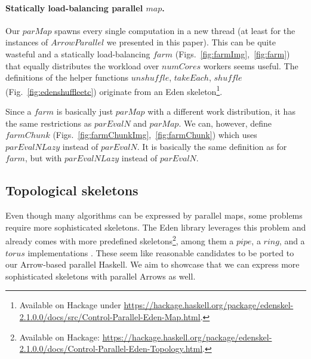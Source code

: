 \documentclass{jfp1}
\newcommand{\Conid}[1]{\mathit{#1}}
\newcommand{\Varid}[1]{\mathit{#1}}
\begin{document}
\paragraph{Statically load-balancing parallel \ensuremath{\Varid{map}}.}
Our \ensuremath{\Varid{parMap}} spawns every single computation in a new thread (at least for the instances of \ensuremath{\Conid{ArrowParallel}} we presented in this paper). This can be quite wasteful and a statically load-balancing \ensuremath{\Varid{farm}} (Figs.~\ref{fig:farmImg},~\ref{fig:farm}) that equally distributes the workload over \ensuremath{\Varid{numCores}} workers seems useful.
The definitions of the helper functions \ensuremath{\Varid{unshuffle}}, \ensuremath{\Varid{takeEach}}, \ensuremath{\Varid{shuffle}} (Fig.~\ref{fig:edenshuffleetc}) originate from an Eden skeleton\footnote{Available on Hackage under \url{https://hackage.haskell.org/package/edenskel-2.1.0.0/docs/src/Control-Parallel-Eden-Map.html}.}.

Since a \ensuremath{\Varid{farm}}  is basically just \ensuremath{\Varid{parMap}} with a different work distribution, it has the same restrictions as \ensuremath{\Varid{parEvalN}} and \ensuremath{\Varid{parMap}}. We can, however, define \ensuremath{\Varid{farmChunk}} (Figs.~\ref{fig:farmChunkImg},~\ref{fig:farmChunk}) which uses \ensuremath{\Varid{parEvalNLazy}} instead of \ensuremath{\Varid{parEvalN}}. It is basically the same definition as for \ensuremath{\Varid{farm}}, but with \ensuremath{\Varid{parEvalNLazy}} instead of \ensuremath{\Varid{parEvalN}}.

\subsection{Topological skeletons}
\label{sec:topology-skeletons}
Even though many algorithms can be expressed by parallel maps, some problems require more sophisticated skeletons. The Eden library leverages this problem and already comes with more predefined skeletons\footnote{Available on Hackage: \url{https://hackage.haskell.org/package/edenskel-2.1.0.0/docs/Control-Parallel-Eden-Topology.html}.}, among them a \ensuremath{\Varid{pipe}}, a \ensuremath{\Varid{ring}}, and a \ensuremath{\Varid{torus}} implementations \citep{Eden:SkeletonBookChapter02}. These seem like reasonable candidates to be ported to our Arrow-based parallel Haskell. We aim to showcase that we can express more sophisticated skeletons with parallel Arrows as well.
\end{document}
